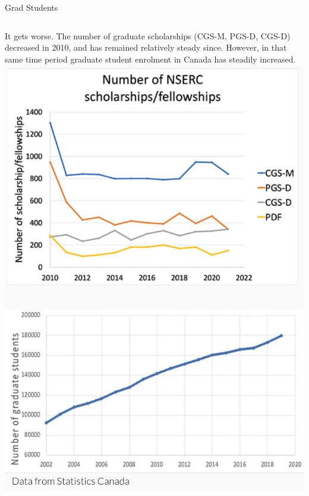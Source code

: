\documentclass{beamer}
\begin{document}
\begin{frame}{Grad Students}
	\begin{columns}
		It gets worse. The number of graduate scholarships (CGS-M, PGS-D, CGS-D) decreased in 2010, and has remained relatively steady since. However, in that same time period graduate student enrolment in Canada has steadily increased.
		\includegraphics[width=1\textwidth]{../images/gradnumberscholarships.jpeg}
	\end{columns}
	
\end{frame}
\end{document}
